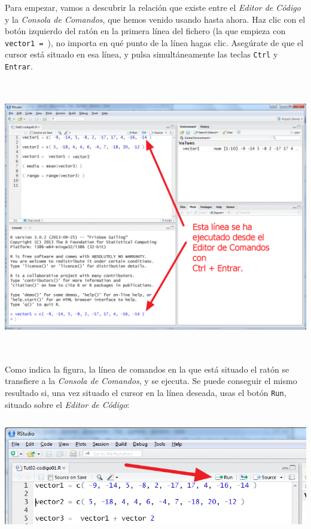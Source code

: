 \documentclass[10pt,a4paper]{article}\usepackage[]{graphicx}\usepackage[]{color}
\begin{document}
Para empezar, vamos a descubrir la relación que existe entre el {\em Editor de Código} y la {\em Consola de Comandos}, que hemos venido usando hasta ahora. Haz clic con el botón izquierdo del ratón en la primera línea del fichero (la que empieza con {\tt vector1 = }), no importa en qué punto de la línea hagas clic. Asegúrate de que el cursor está situado en esa línea, y pulsa simultáneamente las teclas {{\tt Ctrl} y {\tt Entrar}}.
    \begin{center}
    \includegraphics[height=12cm]{../fig/Tut02-20a.png}
    \end{center}
Como indica la figura, la línea de comandos en la que está situado el ratón se transfiere a la {\em Consola de Comandos}, y se ejecuta. Se puede conseguir el mismo resultado si, una vez situado el cursor en la línea deseada, usas el botón {\tt Run}, situado sobre el {\em Editor de Código}:
    \begin{center}
    \includegraphics[height=5cm]{../fig/Tut02-21.png}
    \end{center}
\end{document}
